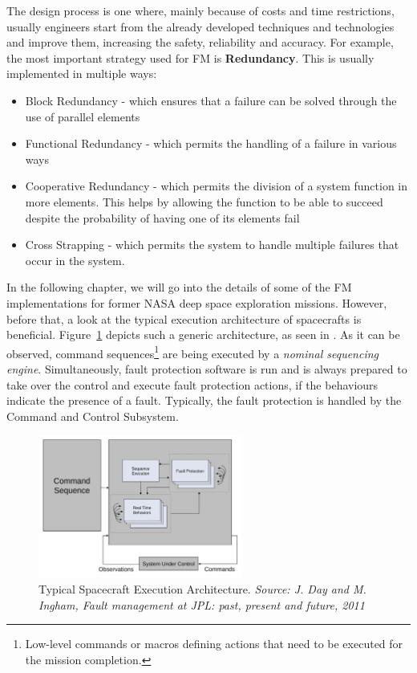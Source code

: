 The design process is one where, mainly because of costs and time restrictions,
usually engineers start from the already developed techniques and technologies
and improve them, increasing the safety, reliability and accuracy. For example,
the most important strategy used for FM is \textbf{Redundancy}. This is usually
implemented in multiple ways\cite{surv-nasa-mars}:
\begin{itemize}
\item Block Redundancy - which ensures that a failure can be solved through the
use of parallel elements
\item Functional Redundancy - which permits the handling of a failure in various
ways
\item Cooperative Redundancy - which permits the division of a system function
in more elements. This helps by allowing the function to be able to succeed despite
the probability of having one of its elements fail
\item Cross Strapping - which permits the system to handle multiple failures
that occur in the system.
\end{itemize}

In the following chapter, we will go into the details of some of the FM
implementations for former NASA deep space exploration missions. However, before
that, a look at the typical execution architecture of spacecrafts is beneficial.
Figure~\ref{fig:spacecraft_execution_architecture} depicts such a generic
architecture, as seen in \cite{fm-jpl}. As it can be observed, command
sequences\footnote{Low-level commands or macros defining actions that need to be
executed for the mission completion.} are being executed by a \textit{nominal
sequencing engine}. Simultaneously, fault protection software is run and is
always prepared to take over the control and execute fault protection actions,
if the behaviours indicate the presence of a fault. Typically, the fault
protection is handled by the Command and Control Subsystem.

\begin{figure}[htb]
	\begin{center}
	\includegraphics[width=0.6\textwidth]{img/spacecraft_execution_architecture.pdf}
	\caption{Typical Spacecraft Execution Architecture. \small{\textit{Source: J.
	Day and M. Ingham, Fault management at JPL: past, present and future, 2011}}}
	\label{fig:spacecraft_execution_architecture}
	\end{center}
\end{figure}

